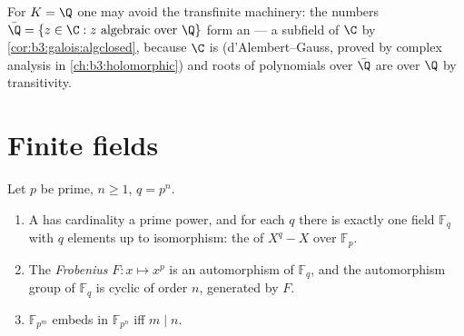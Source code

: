\begin{remark}\label{rem:b3:galois:closureexamples}
For $K = \Q$ one may avoid the transfinite machinery: the
 numbers $\bar\Q = \{z \in \C : z \text{ algebraic over
} \Q\}$ form an  --- a subfield of $\C$ by
\cref{cor:b3:galois:algclosed},  because $\C$
is (d'Alembert--Gauss, proved by complex analysis in
\cref{ch:b3:holomorphic}) and roots of polynomials over $\bar\Q$
are  over $\Q$ by transitivity.
\end{remark}

\section{Finite fields}

\begin{theorem}\label{thm:b3:galois:finitefields}
Let $p$ be prime, $n \geq 1$, $q = p^n$.
\begin{enumerate}
  \item A  has cardinality a prime power, and for
        each $q$ there is exactly one field $\mathbb F_q$ with
        $q$ elements up to isomorphism: the  of
        $X^q - X$ over $\mathbb F_p$.
  \item The \emph{Frobenius} $F
        \colon x \mapsto x^p$ is an automorphism of $\mathbb
        F_q$, and the automorphism group of $\mathbb F_q$ is
        cyclic of order $n$, generated by $F$.
  \item $\mathbb F_{p^m}$ embeds in $\mathbb F_{p^n}$ iff $m \mid
        n$.
\end{enumerate}
\end{theorem}

